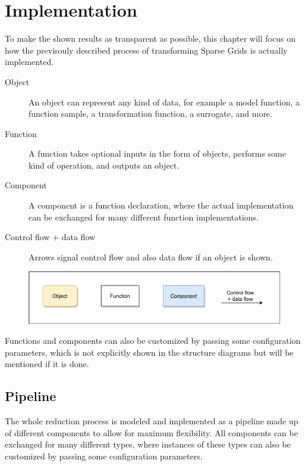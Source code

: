 \documentclass[
  a4paper,  %
  twoside,  %
  bibliography=totoc,
  headsepline,
  cleardoublepage=empty,
  parskip=half,
  draft=false
]{scrbook}
\begin{document}
\chapter{Implementation}

To make the shown results as transparent as possible, this chapter will focus on how the previsouly described process of transforming Sparse Grids is actually implemented.

\begin{description}
\item[Object] An object can represent any kind of data, for example a model function, a function sample, a transformation function, a surrogate, and more.
\item[Function] A function takes optional inputs in the form of objects, performs some kind of operation, and outputs an object.
\item[Component] A component is a function declaration, where the actual implementation can be exchanged for many different function implementations.
\item[Control flow + data flow] Arrows signal control flow and also data flow if an object is shown.
\end{description}

\begin{figure}[H]
\includegraphics[width=\textwidth]{graphics/definitions.pdf}
\label{fig:defs}
\end{figure}

Functions and components can also be customized by passing some configuration parameters, which is not explicitly shown in the structure diagrams but will be mentioned if it is done.

\newpage
\section{Pipeline}

The whole reduction process is modeled and implemented as a pipeline made up of different components to allow for maximum flexibility.
All components can be exchanged for many different types, where instances of these types can also be customized by passing some configuration parameters.
\end{document}
